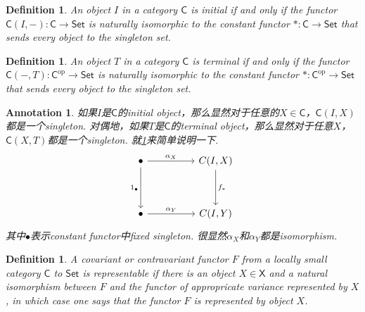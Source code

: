 \documentclass{article}
\newtheorem{definition}[theorem]{Definition}
\newtheorem{annotation}[theorem]{Annotation}
\newcommand*{\cat}[1]{\textsf{#1}\xspace}
\newcommand{\Set}{\textsf{Set}\xspace}
\newcommand{\op}{\textrm{op}}
\begin{document}
\begin{definition}\label{initial object characterized by representable functor}
\rm An object $I$ in a category $\cat{C}$ is initial if and only if the functor $\cat{C}(I,-):\cat{C}\to\Set$ is naturally isomorphic to the constant functor $*:\cat{C} \to \Set$ that sends every object to the singleton set. 
\end{definition}

\begin{definition}
\rm An object $T$ in a category $\cat{C}$ is terminal if and only if the functor $\cat{C}(-,T):\cat{C}^\op\to\Set$ is naturally isomorphic to the constant functor $*:\cat{C}^{\op} \to \Set$ that sends every object to the singleton set. 
\end{definition}

\begin{annotation}
\rm 如果$I$是$\cat{C}$的initial object，那么显然对于任意的$X \in \cat{C}$，$\cat{C}(I,X)$都是一个singleton. 对偶地，如果$T$是$\cat{C}$的terminal object，那么显然对于任意$X$，$\cat{C}(X,T)$都是一个singleton. 就\ref{initial object characterized by representable functor}来简单说明一下.
$$
\begin{tikzcd}
\bullet \arrow[rr, "\alpha_X"] \arrow[dd, "1_\bullet"'] &  & {C(I,X)} \arrow[dd, "f_*"] \\
                                                   &  &                            \\
\bullet \arrow[rr, "\alpha_Y"]                     &  & {C(I,Y)}                  
\end{tikzcd}
$$
其中$\bullet$表示constant functor中fixed singleton. 很显然$\alpha_X$和$\alpha_Y$都是isomorphism. 
\end{annotation}

\begin{definition}
\rm A covariant or contravariant functor $F$ from a locally small category $\cat{C}$ to $\Set$ is representable if there is an object $X \in \cat{X}$ and a natural isomorphism between $F$ and the functor of appropricate variance represented by $X$, in which case one says that the functor $F$ is represented by object $X$. 
\end{definition}
\end{document}
